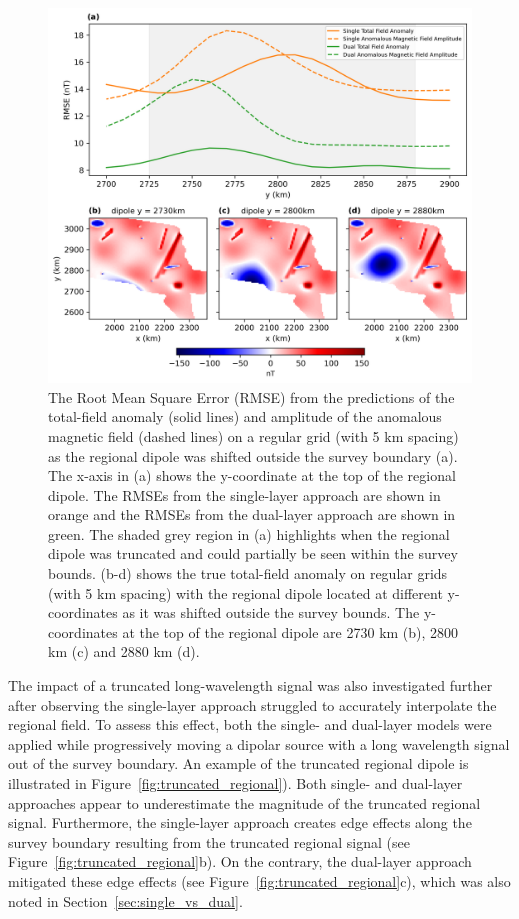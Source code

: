 \begin{figure}[tb!]
\centering
\includegraphics[width=1\linewidth]{figures/truncated_regional_rmses.png}
\caption{
    The Root Mean Square Error (RMSE) from the predictions of the total-field anomaly (solid lines) and amplitude of the anomalous magnetic field (dashed lines) on a regular grid (with 5 km spacing) as the regional dipole was shifted outside the survey boundary (a). The x-axis in (a) shows the y-coordinate at the top of the regional dipole. The RMSEs from the single-layer approach are shown in orange and the RMSEs from the dual-layer approach are shown in green. The shaded grey region in (a) highlights when the regional dipole was truncated and could partially be seen within the survey bounds. (b-d) shows the true total-field anomaly on regular grids (with 5 km spacing) with the regional dipole located at different y-coordinates as it was shifted outside the survey bounds. The y-coordinates at the top of the regional dipole are 2730 km (b), 2800 km (c) and 2880 km (d).
}
\label{fig:truncated_regional_rmses}
\end{figure}

The impact of a truncated long-wavelength signal was also investigated further after observing the single-layer approach struggled to accurately interpolate the regional field. To assess this effect, both the single- and dual-layer models were applied while progressively moving a dipolar source with a long wavelength signal out of the survey boundary. An example of the truncated regional dipole is illustrated in Figure~\ref{fig:truncated_regional}). Both single- and dual-layer approaches appear to underestimate the magnitude of the truncated regional signal. Furthermore, the single-layer approach creates edge effects along the survey boundary resulting from the truncated regional signal (see Figure~\ref{fig:truncated_regional}b). On the contrary, the dual-layer approach mitigated these edge effects (see Figure~\ref{fig:truncated_regional}c), which was also noted in Section~\ref{sec:single_vs_dual}.

